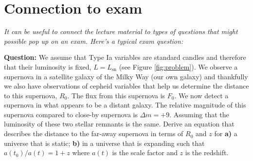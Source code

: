 \documentclass[a4paper,12pt]{article}
\theoremstyle{remark}
\newcommand{\mrm}[1]{\mathrm{#1}}
\renewcommand{\=}[1]{\stackrel{#1}{=}} %
\theoremstyle{plain}
\theoremstyle{definition}
\begin{document}
\section{Connection to exam}
\textit{It can be useful to connect the lecture material to types of questions that might possible pop up on an exam. Here's a typical exam question:}

\textbf{Question:} We assume that Type Ia variables are standard candles and therefore that their luminosity is fixed, $L = L_\mrm{sn}$ (see Figure \ref{fig:problem}). We observe a supernova in a satellite galaxy of the Milky Way (our own galaxy) and thankfully we also have observations of cepheid variables that help us determine the distance to this supernova, $R_0$. The flux from this supernova is $F_0$. We now detect a supernova in what appears to be a distant galaxy. The relative magnitude of this supernova compared to close-by supernova is $\Delta m = +9$. Assuming that the luminosity of these two stellar remnants is the same. Derive an equation that describes the distance to the far-away supernova in terms of $R_0$ and $z$ for \textbf{a)} a universe that is static; \textbf{b)} in a universe that is expanding such that $a(t_0)/a(t) = 1 + z$ where $a(t)$ is the scale factor and $z$ is the redshift.
\end{document}
